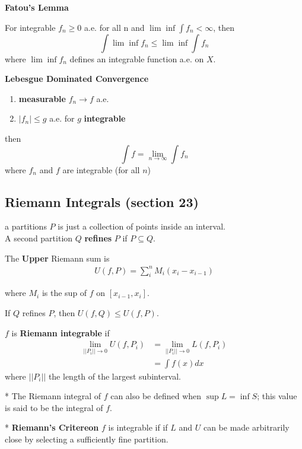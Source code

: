 \documentclass[a4paper, 12pt]{article}
\newcommand{\bt}[1]{\textbf{#1}} %
\newcommand{\eq}[1]{\begin{align*}#1\end{align*}} %
\renewcommand{\eq}[1]{\begin{align*}#1\end{align*}} %
\newcommand{\gray}[1]{{\leavevmode\color[gray]{0.5}{#1}}} %
\begin{document}
\begin{multicols}{2}
\centerline{\bt{Fatou's Lemma}}
For integrable $f_n \geq 0$ a.e. for all n and 
$\lim \inf \int f_n < \infty$, then 
$$\int \lim \inf f_n \leq \lim \inf \int f_n$$
where $\lim \inf f_n$ defines an integrable function a.e. on $X$. \\
\gray{``$\lim \inf$ of integrable is integrable and less than integral of parts"}

\centerline{\bt{Lebesgue Dominated Convergence}}
\begin{enumerate}
    \item \bt{measurable} $f_n \rightarrow f$ a.e.
    \item $|f_n| \leq g$ a.e. for $g$ \bt{integrable}
\end{enumerate}
then 
$$\int f = \lim_{n \rightarrow \infty} \int f_n$$
where $f_n$ and $f$ are integrable (for all $n$)\\
\gray{``interchange $\lim$ and $\int$ for measurable functions bounded by an integrable function"}





\subsection{Riemann Integrals (section 23)}

a partitions $P$ is just a collection of points inside an interval. \\
A second partition $Q$ \bt{refines} $P$ if $P \subseteq Q$.

The \bt{Upper} Riemann sum is 
\eq{U(f, P) = \sum_{i}^n M_i (x_i - x_{i-1})}

where $M_i$ is the sup of $f$ on $[x_{i-1}, x_i]$.\\
\gray{(similarly lower sum is defined with $m_i$, the inf on the interval)}

If $Q$ refines $P$, then $U(f, Q) \leq U(f, P)$. \\
\gray{($L(f, Q) \geq L(f, P)$).}

$f$ is \bt{Riemann integrable} if 
\eq{\lim_{||P_i|| \rightarrow 0} U(f, P_i) 
& = \lim_{||P_i|| \rightarrow 0} L(f, P_i)  \\
& = \int f(x) dx
}
where $||P_i||$ the length of the largest subinterval.


* The Riemann integral of $f$ can also be defined when $\sup L = \inf S$; this value 
is said to be the integral of $f$.

* \bt{Riemann's Critereon} $f$ is integrable if if $L$ and $U$ can be made arbitrarily close
by selecting a sufficiently fine partition.


\end{multicols}
\end{document}
